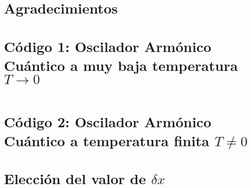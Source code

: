 \documentclass[%
 reprint,
 amsmath,amssymb,
 aps,
 pra,
]{revtex4-2}
\begin{document}
\section{\label{Conclusiones}}

\section*{Agradecimientos}

\newpage

\appendix

\begin{widetext}

\section{Código 1: Oscilador Armónico Cuántico a muy baja temperatura \texorpdfstring{$T \rightarrow 0$}{T tendiendo a cero}\label{appx:codigo_baja_temperatura}}

\inputminted[linenos,breaklines]{python}{code_1.py}

\section{Código 2: Oscilador Armónico Cuántico a temperatura finita \texorpdfstring{$T \neq 0$}{T diferente de cero}\label{appx:codigo_temperatura_finita}}

\section{Elección del valor de \texorpdfstring{$\delta x$}{dx}\label{appx:valor-dx}}

\end{widetext}




\nocite{*}

\end{document}
